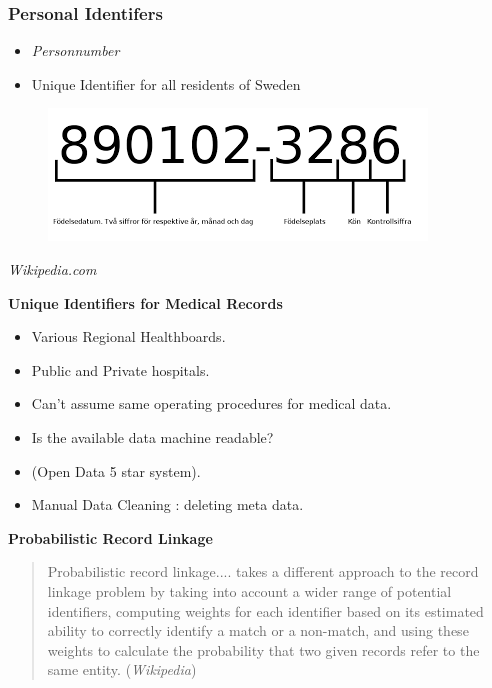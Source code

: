 \documentclass{beamer}
\begin{document}
\begin{frame}
\frametitle{Personal Identifers}
\Large
\begin{itemize}
	\item \textit{Personnumber}
	\item Unique Identifier for all residents of Sweden
\end{itemize}
\begin{figure}
\centering
\includegraphics[width=0.9\linewidth]{personnummerSweden}
\end{figure}
{
\normalsize \textit{Wikipedia.com}
}
\end{frame}
\begin{frame}
	\Large
	\textbf{Unique Identifiers for Medical Records}\bigskip
	\begin{itemize}
		\item Various Regional Healthboards.
		\item Public and Private hospitals.
		\item Can't assume same operating procedures for medical data.
		\item Is the available data machine readable? 
		\item (Open Data 5 star system).
		\item Manual Data Cleaning : deleting meta data.
	\end{itemize}
\end{frame}
		\begin{frame}
			\Large
		\textbf{Probabilistic Record Linkage}
\begin{quote}
	Probabilistic record linkage.... takes a different approach to the record linkage problem by taking into account a wider range of potential identifiers, computing weights for each identifier based on its estimated ability to correctly identify a match or a non-match, and using these weights to calculate the probability that two given records refer to the same entity. (\textit{Wikipedia})
\end{quote}
		\end{frame}
\end{document}

